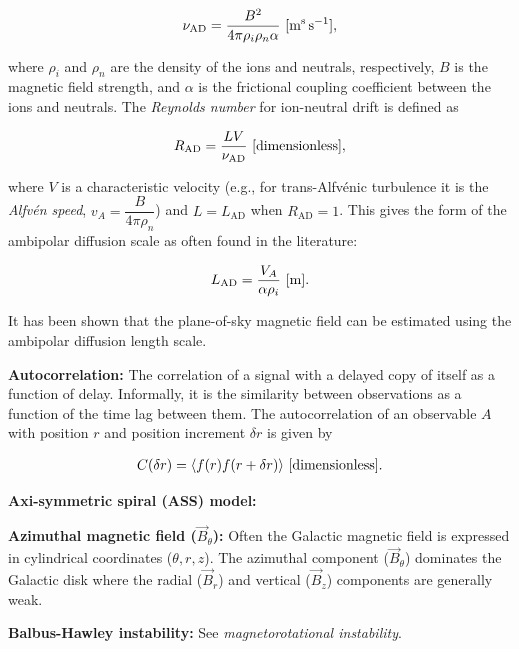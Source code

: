 \documentclass[a4paper,10pt]{article}
\begin{document}
\begin{align*}
    \nu_\mathrm{AD} = \frac{B^2}{4\pi\rho_i\rho_n\alpha} ~ [{\rm m^s\,s^{-1}}],
\end{align*}

{\noindent}where $\rho_i$ and $\rho_n$ are the density of the ions and neutrals, respectively, $B$ is the magnetic field strength, and $\alpha$ is the frictional coupling coefficient between the ions and neutrals. The \textit{Reynolds number} for ion-neutral drift is defined as

\begin{align*}
    R_\mathrm{AD} = \frac{LV}{\nu_\mathrm{AD}} ~ [{\rm dimensionless}],
\end{align*}

{\noindent}where $V$ is a characteristic velocity (e.g., for trans-Alfv\'enic turbulence it is the \textit{Alfv\'en speed}, $v_A = \dfrac{B}{4\pi\rho_n}$) and $L=L_\mathrm{AD}$ when $R_\mathrm{AD}=1$. This gives the form of the ambipolar diffusion scale as often found in the literature:

\begin{align*}
    L_\mathrm{AD} = \frac{V_A}{\alpha\rho_i} ~ [{\rm m}].
\end{align*}

{\noindent}It has been shown that the plane-of-sky magnetic field can be estimated using the ambipolar diffusion length scale. 

{\noindent}\textbf{Autocorrelation:} The correlation of a signal with a delayed copy of itself as a function of delay. Informally, it is the similarity between observations as a function of the time lag between them. The autocorrelation of an observable $A$ with position $r$ and position increment $\delta r$ is given by

\begin{align*}
    C(\delta r) = \langle f(r)f(r+\delta r)\rangle ~ [{\rm dimensionless}].
\end{align*}

{\noindent}\textbf{Axi-symmetric spiral (ASS) model:}

{\noindent}\textbf{Azimuthal magnetic field ($\vec{B}_\theta$):} Often the Galactic magnetic field is expressed in cylindrical coordinates ($\theta, r, z$). The azimuthal component ($\vec{B}_\theta$) dominates the Galactic disk where the radial ($\vec{B}_r$) and vertical ($\vec{B}_z$) components are generally weak.

{\noindent}\textbf{Balbus-Hawley instability:} See \textit{magnetorotational instability}.
\end{document}
